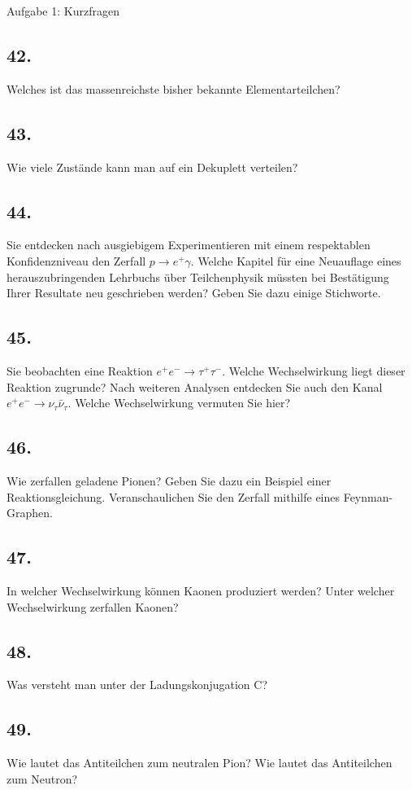 \begin{aufgabe}{Aufgabe 1: Kurzfragen}
    \subsection{42.}
    Welches ist das massenreichste bisher bekannte Elementarteilchen?

    \subsection{43.}
    Wie viele Zustände kann man auf ein Dekuplett verteilen?

    \subsection{44.}
    Sie entdecken nach ausgiebigem Experimentieren mit einem respektablen Konfidenzniveau den Zerfall $p \to e^+ \gamma$.
    Welche Kapitel für eine Neuauflage eines herauszubringenden Lehrbuchs über Teilchenphysik müssten bei Bestätigung Ihrer Resultate neu geschrieben werden?
    Geben Sie dazu einige Stichworte.

    \subsection{45.}
    Sie beobachten eine Reaktion $e^+ e^- \to \tau^+ \tau^-$.
    Welche Wechselwirkung liegt dieser Reaktion zugrunde?
    Nach weiteren Analysen entdecken Sie auch den Kanal $e^+ e^- \to \nu_\tau \bar\nu_\tau$.
    Welche Wechselwirkung vermuten Sie hier?

    \subsection{46.}
    Wie zerfallen geladene Pionen?
    Geben Sie dazu ein Beispiel einer Reaktionsgleichung.
    Veranschaulichen Sie den Zerfall mithilfe eines Feynman-Graphen.

    \subsection{47.}
    In welcher Wechselwirkung können Kaonen produziert werden?
    Unter welcher Wechselwirkung zerfallen Kaonen?

    \subsection{48.}
    Was versteht man unter der Ladungskonjugation C?

    \subsection{49.}
    Wie lautet das Antiteilchen zum neutralen Pion?
    Wie lautet das Antiteilchen zum Neutron?
\end{aufgabe}

